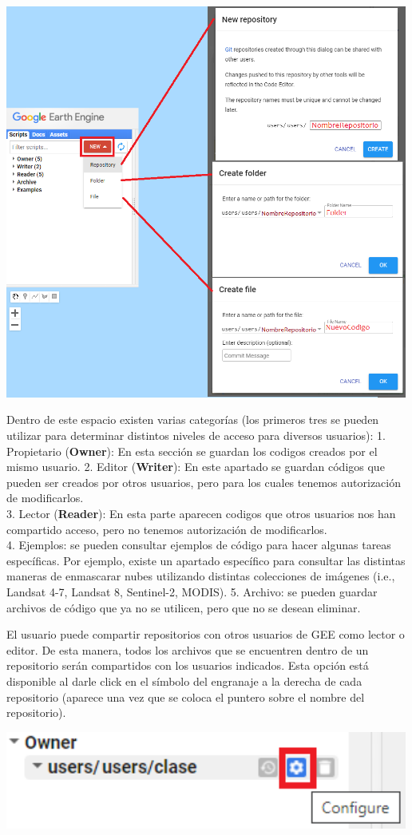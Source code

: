 \documentclass[
]{article}
\begin{document}
\includegraphics[width=500px]{Img/repositorio}

Dentro de este espacio existen varias categorías (los primeros tres se
pueden utilizar para determinar distintos niveles de acceso para
diversos usuarios): 1. Propietario (\textbf{Owner}): En esta sección se
guardan los codigos creados por el mismo usuario. 2. Editor
(\textbf{Writer}): En este apartado se guardan códigos que pueden ser
creados por otros usuarios, pero para los cuales tenemos autorización de
modificarlos.\\
3. Lector (\textbf{Reader}): En esta parte aparecen codigos que otros
usuarios nos han compartido acceso, pero no tenemos autorización de
modificarlos.\\
4. Ejemplos: se pueden consultar ejemplos de código para hacer algunas
tareas específicas. Por ejemplo, existe un apartado específico para
consultar las distintas maneras de enmascarar nubes utilizando distintas
colecciones de imágenes (i.e., Landsat 4-7, Landsat 8, Sentinel-2,
MODIS). 5. Archivo: se pueden guardar archivos de código que ya no se
utilicen, pero que no se desean eliminar.

\begin{tipblock}
El usuario puede compartir repositorios con otros usuarios de GEE como
lector o editor. De esta manera, todos los archivos que se encuentren
dentro de un repositorio serán compartidos con los usuarios indicados.
Esta opción está disponible al darle click en el símbolo del engranaje a
la derecha de cada repositorio (aparece una vez que se coloca el puntero
sobre el nombre del repositorio).

\includegraphics[width=500px]{Img/engranaje}

\end{tipblock}
\end{document}
